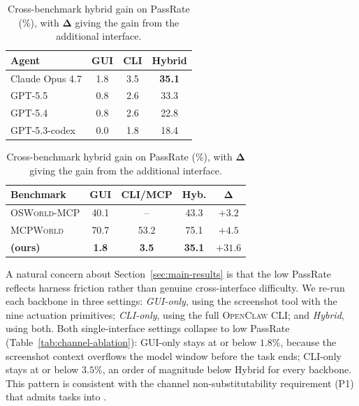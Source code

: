 \begin{table}[t!]
\centering
\footnotesize
\begin{minipage}[t]{0.49\textwidth}
\centering
\setlength{\tabcolsep}{6pt}
\renewcommand{\arraystretch}{1.05}
\caption{Interface ablation on PassRate. \textbf{GUI}: GUI-only tool pool. \textbf{CLI}: CLI-only tool pool. \textbf{Hybrid}: full tool pool. The best thinking mode is chosen.}
\label{tab:channel-ablation}
\begin{tabular}{l ccc}
\toprule
\textbf{Agent} & \textbf{GUI} & \textbf{CLI} & \textbf{Hybrid} \\
\midrule
Claude Opus 4.7    & 1.8 & 3.5 & \textbf{35.1} \\
GPT-5.5            & 0.8 & 2.6 & 33.3 \\
GPT-5.4            & 0.8 & 2.6 & 22.8 \\
GPT-5.3-codex      & 0.0 & 1.8 & 18.4 \\
\bottomrule
\end{tabular}
\end{minipage}\hfill
\begin{minipage}[t]{0.49\textwidth}
\centering
\setlength{\tabcolsep}{4pt}
\renewcommand{\arraystretch}{1.05}
\caption{Cross-benchmark hybrid gain on PassRate (\%), with $\boldsymbol{\Delta}$ giving the gain from the additional interface.}
\label{tab:cross-bench-gap}
\begin{tabular}{@{}l c c c c@{}}
\toprule
\textbf{Benchmark} & \textbf{GUI} & \textbf{CLI/MCP} & \textbf{Hyb.} & $\boldsymbol{\Delta}$ \\
\midrule
\textsc{OSWorld-MCP}      & 40.1 & --   & 43.3 & $+3.2$ \\
\textsc{MCPWorld}         & 70.7 & 53.2 & 75.1 & $+4.5$ \\
\rowcolor{msfthighlight}
\textbf{\Eyeson{} (ours)} & \textbf{1.8} & \textbf{3.5} & \textbf{35.1} & $\mathbf{+31.6}$ \\
\bottomrule
\end{tabular}
\end{minipage}
\end{table}

A natural concern about Section~\ref{sec:main-results} is that the low PassRate reflects harness friction rather than genuine cross-interface difficulty. We re-run each backbone in three settings: \emph{GUI-only}, using the screenshot tool with the nine actuation primitives; \emph{CLI-only}, using the full \textsc{OpenClaw} CLI; and \emph{Hybrid}, using both. Both single-interface settings collapse to low PassRate (Table~\ref{tab:channel-ablation}): GUI-only stays at or below $1.8\%$, because the screenshot context overflows the model window before the task ends; CLI-only stays at or below $3.5\%$, an order of magnitude below Hybrid for every backbone. This pattern is consistent with the channel non-substitutability requirement (P1) that admits tasks into \Eyeson{}.

